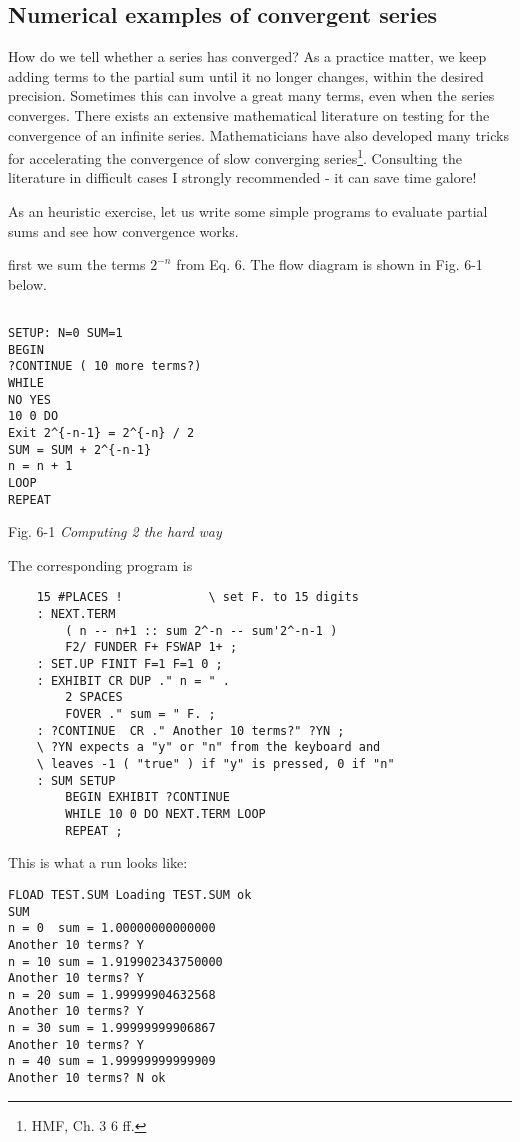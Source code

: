 \subsection{Numerical examples of convergent series}
How do we tell whether a series has converged? As a practice matter, we keep adding terms to the partial sum until it no longer changes, within the desired precision. Sometimes this can involve a great many terms, even when the series converges. There exists an extensive mathematical literature on testing for the convergence of an infinite series. Mathematicians have also developed many tricks for accelerating the convergence of slow converging series\footnote{HMF, Ch. 3 6 ff.}. Consulting the literature in difficult cases I strongly recommended - it can save time galore!

As an heuristic exercise, let us write some simple programs to evaluate partial sums and see how convergence works.

first we sum the terms $2^{-n}$ from Eq. 6. The flow diagram is shown in Fig. 6-1 below.

\begin{lstlisting}

SETUP: N=0 SUM=1
BEGIN
?CONTINUE ( 10 more terms?)
WHILE
NO YES
10 0 DO
Exit 2^{-n-1} = 2^{-n} / 2
SUM = SUM + 2^{-n-1}
n = n + 1
LOOP
REPEAT
\end{lstlisting}

Fig. 6-1 \textit{Computing 2 the hard way}

The corresponding program is

\begin{lstlisting}
    15 #PLACES !            \ set F. to 15 digits
    : NEXT.TERM
        ( n -- n+1 :: sum 2^-n -- sum'2^-n-1 )
        F2/ FUNDER F+ FSWAP 1+ ;
    : SET.UP FINIT F=1 F=1 0 ;
    : EXHIBIT CR DUP ." n = " .
        2 SPACES
        FOVER ." sum = " F. ;
    : ?CONTINUE  CR ." Another 10 terms?" ?YN ;
    \ ?YN expects a "y" or "n" from the keyboard and
    \ leaves -1 ( "true" ) if "y" is pressed, 0 if "n"
    : SUM SETUP
        BEGIN EXHIBIT ?CONTINUE
        WHILE 10 0 DO NEXT.TERM LOOP
        REPEAT ;
\end{lstlisting}

This is what a run looks like:

\begin{lstlisting}
FLOAD TEST.SUM Loading TEST.SUM ok
SUM
n = 0  sum = 1.00000000000000
Another 10 terms? Y
n = 10 sum = 1.919902343750000
Another 10 terms? Y
n = 20 sum = 1.99999904632568
Another 10 terms? Y
n = 30 sum = 1.99999999906867
Another 10 terms? Y
n = 40 sum = 1.99999999999909
Another 10 terms? N ok
\end{lstlisting}

